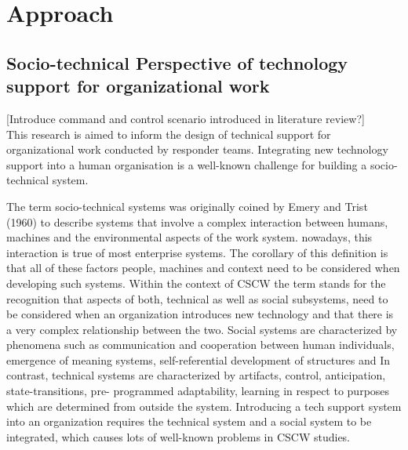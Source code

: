\chapter{Approach}\label{ch:approach}


\section{Socio-technical Perspective of technology support for organizational work}
[Introduce command and control scenario introduced in literature review?]\\

This research is aimed to inform the design of technical support for organizational work conducted by responder teams. Integrating new technology support into a human organisation is a well-known challenge for building a socio-technical system. 

The term socio-technical systems was originally coined by Emery and Trist (1960) to describe systems that involve a complex interaction between humans, machines and the environmental aspects of the work system. nowadays, this interaction is true of most enterprise systems. The corollary of this definition is that all of these factors  people, machines and context need to be considered when developing such systems. Within the context of CSCW the term stands for the recognition that aspects of both, technical as well as social subsystems, need to be considered when an organization introduces new technology and that there is a very complex relationship between the two. Social systems are characterized by phenomena such as communication and cooperation between human individuals, emergence of meaning systems, self-referential development of structures and In contrast, technical systems are characterized by artifacts, control, anticipation, state-transitions, pre- programmed adaptability, learning in respect to purposes which are determined from outside the system. Introducing a tech support system into an organization requires the technical system and a social system to be integrated, which causes lots of well-known problems in CSCW studies. 

